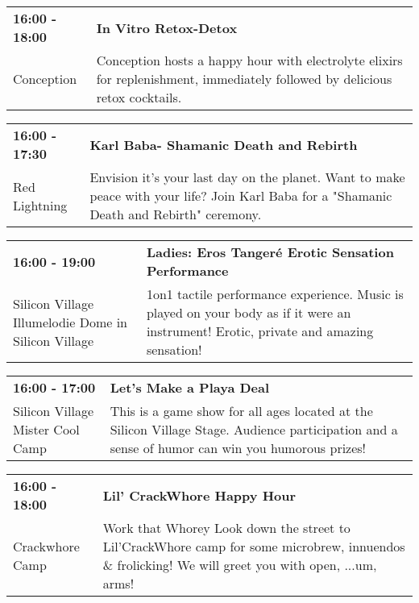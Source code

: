 \begin{tabular}{ p{1in} p{2.2in} }
    \textbf{16:00 - 18:00} & \textbf{In Vitro Retox-Detox} \\
    Conception \newline  & Conception hosts a happy hour with electrolyte elixirs for replenishment, immediately followed by delicious retox cocktails. \\
    \hline 
\end{tabular}
    
\begin{tabular}{ p{1in} p{2.2in} }
    \textbf{16:00 - 17:30} & \textbf{Karl Baba- Shamanic Death and Rebirth} \\
    Red Lightning \newline  & Envision it's your last day on the planet. Want to make peace with your life? Join Karl Baba for a "Shamanic Death and Rebirth" ceremony. \\
    \hline 
\end{tabular}
    
\begin{tabular}{ p{1in} p{2.2in} }
    \textbf{16:00 - 19:00} & \textbf{Ladies: Eros Tanger\'e Erotic Sensation Performance} \\
    Silicon Village \newline Illumelodie Dome in Silicon Village & 1on1 tactile performance experience. Music is played on your body as if it were an instrument! Erotic, private and amazing sensation! \\
    \hline 
\end{tabular}
    
\begin{tabular}{ p{1in} p{2.2in} }
    \textbf{16:00 - 17:00} & \textbf{Let's Make a Playa Deal} \\
    Silicon Village \newline Mister Cool Camp & This is a game show for all ages located at the Silicon Village Stage. Audience participation and a sense of humor can win you humorous prizes! \\
    \hline 
\end{tabular}
    
\begin{tabular}{ p{1in} p{2.2in} }
    \textbf{16:00 - 18:00} & \textbf{Lil' CrackWhore Happy Hour} \\
    Crackwhore Camp \newline  & Work that Whorey Look down the street to Lil'CrackWhore camp for some microbrew, innuendos \& frolicking! We will greet you with open, ...um, arms! \\
    \hline 
\end{tabular}
    
